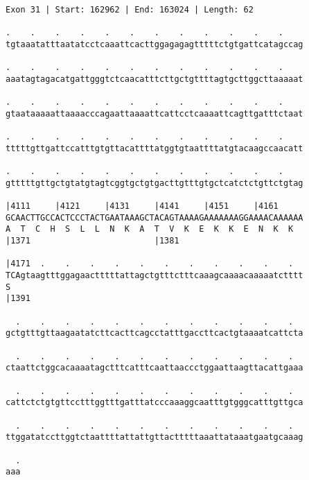 \documentclass{article}
\begin{document}
\begin{Verbatim}[fontfamily=courier]
Exon 31 | Start: 162962 | End: 163024 | Length: 62

.    .    .    .    .    .    .    .    .    .    .    .    
tgtaaatatttaatatcctcaaattcacttggagagagtttttctgtgattcatagccag

.    .    .    .    .    .    .    .    .    .    .    .    
aaatagtagacatgattgggtctcaacatttcttgctgttttagtgcttggcttaaaaat

.    .    .    .    .    .    .    .    .    .    .    .    
gtaataaaaattaaaacccagaattaaaattcattcctcaaaattcagttgatttctaat

.    .    .    .    .    .    .    .    .    .    .    .    
tttttgttgattccatttgtgttacattttatggtgtaattttatgtacaagccaacatt

.    .    .    .    .    .    .    .    .    .    .    .    
gtttttgttgctgtatgtagtcggtgctgtgacttgtttgtgctcatctctgttctgtag

|4111     |4121     |4131     |4141     |4151     |4161     
GCAACTTGCCACTCCCTACTGAATAAAGCTACAGTAAAAGAAAAAAAGGAAAACAAAAAA
A  T  C  H  S  L  L  N  K  A  T  V  K  E  K  K  E  N  K  K  
|1371                         |1381                         

|4171  .    .    .    .    .    .    .    .    .    .    .  
TCAgtaagtttggagaactttttattagctgtttctttcaaagcaaaacaaaaatctttt
S                                                           
|1391                                                       

  .    .    .    .    .    .    .    .    .    .    .    .  
gctgtttgttaagaatatcttcacttcagcctatttgaccttcactgtaaaatcattcta

  .    .    .    .    .    .    .    .    .    .    .    .  
ctaattctggcacaaaatagctttcatttcaattaaccctggaattaagttacattgaaa

  .    .    .    .    .    .    .    .    .    .    .    .  
cattctctgtgttcctttggtttgatttatcccaaaggcaatttgtgggcatttgttgca

  .    .    .    .    .    .    .    .    .    .    .    .  
ttggatatccttggtctaattttattattgttactttttaaattataaatgaatgcaaag

  .
aaa
\end{Verbatim}
\newpage
\end{document}
